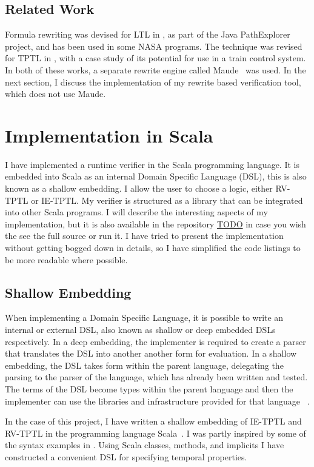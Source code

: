 \documentclass[a4paper]{article}
\begin{document}
\subsection{Related Work}
Formula rewriting was devised for LTL in \textcite{rosu2005rewriting}, as part of the Java PathExplorer project, and has been used in some NASA programs. The technique was revised for TPTL in \textcite{chai2013rewriting}, with a case study of its potential for use in a train control system. In both of these works, a separate rewrite engine called Maude~\autocite{clavel2002maude} was used. In the next section, I discuss the implementation of my rewrite based verification tool, which does not use Maude.

\section{Implementation in Scala}\label{implementaion}
I have implemented a runtime verifier in the Scala programming language.
It is embedded into Scala as an internal Domain Specific Language (DSL), this is also known as a shallow embedding.
I allow the user to choose a logic, either RV-TPTL or IE-TPTL.
My verifier is structured as a library that can be integrated into other Scala programs.
I will describe the interesting aspects of my implementation, but it is also available in the repository \url{TODO} %
in case you wish the see the full source or run it. I have tried to present the implementation without getting bogged down in details, so I have simplified the code listings to be more readable where possible.

\subsection{Shallow Embedding}
When implementing a Domain Specific Language, it is possible to write an internal or external DSL, also known as shallow or deep embedded DSLs respectively. In a deep embedding, the implementer is required to create a parser that translates the DSL into another another form for evaluation. In a shallow embedding, the DSL takes form within the parent language, delegating the parsing to the parser of the language, which has already been written and tested. The terms of the DSL become types within the parent language and then the implementer can use the libraries and infrastructure provided for that language~
\autocite{gibbons2014foldingdeepshallow}.

In the case of this project, I have written a shallow embedding of IE-TPTL and RV-TPTL in the programming language Scala~\autocite{Odersky04scala}.
I was partly inspired by some of the syntax examples in \textcite{barringer2011tracecontract}.
Using Scala classes, methods, and implicits I have constructed a convenient DSL for specifying temporal properties.
\end{document}
